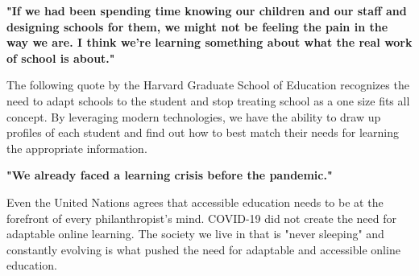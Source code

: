 \textbf{"If we had been spending time knowing our children and our staff and designing schools for them, we might not be feeling the pain in the way we are. I think we're learning something about what the real work of school is about."}\cite{harvard:education}

The following quote by the Harvard Graduate School of Education recognizes the need to adapt schools to the student and stop treating school as a one size fits all concept. By leveraging modern technologies, we have the ability to draw up profiles of each student and find out how to best match their needs for learning the appropriate information. 

\textbf{"We already faced a learning crisis before the pandemic."}\cite{un:education}

Even the United Nations agrees that accessible education needs to be at the forefront of every philanthropist's mind. COVID-19 did not create the need for adaptable online learning. The society we live in that is "never sleeping" and constantly evolving is what pushed the need for adaptable and accessible online education.